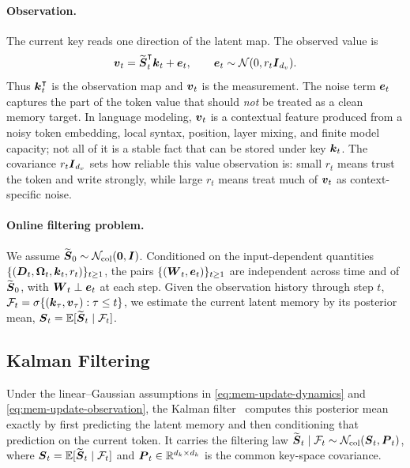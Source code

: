 \documentclass{article} %
\begin{document}
\paragraph{Observation.}
The current key reads one direction of the latent map. The observed value is
\begin{equation}
  \boldsymbol{v}_t = \widetilde{\boldsymbol{S}}_t^{\intercal}\boldsymbol{k}_t + \boldsymbol{e}_t,
  \qquad
  \boldsymbol{e}_t\sim\mathcal N(0,r_t \boldsymbol{I}_{d_v}).
  \label{eq:mem-update-observation}
\end{equation}
Thus $\boldsymbol{k}_t^{\intercal}$ is the observation map and $\boldsymbol{v}_t$ is the measurement. The noise term $\boldsymbol{e}_t$
captures the part of the token value that should \emph{not} be treated as a clean memory
target. In language modeling, $\boldsymbol{v}_t$ is a contextual feature produced from a noisy token embedding,
local syntax, position, layer mixing, and finite model capacity; not all of it is a stable
fact that can be stored under key $\boldsymbol{k}_t$. The covariance $r_t\boldsymbol{I}_{d_v}$ sets how reliable this value
observation is: small $r_t$ means trust the token and write strongly, while large $r_t$ means
treat much of $\boldsymbol{v}_t$ as context-specific noise.

\paragraph{Online filtering problem.}
We assume $\widetilde{\boldsymbol{S}}_0\sim\mathcal N_{\mathrm{col}}(\boldsymbol{0},\boldsymbol{I})$. Conditioned on the
input-dependent quantities $\{(\boldsymbol{D}_t,\boldsymbol{\Omega}_t,\boldsymbol{k}_t,r_t)\}_{t\geq1}$, the pairs
$\{(\boldsymbol{W}_t,\boldsymbol{e}_t)\}_{t\geq1}$ are independent across time and of
$\widetilde{\boldsymbol{S}}_0$, with $\boldsymbol{W}_t\perp\boldsymbol{e}_t$ at each step.
Given the observation history through step $t$,
$\mathcal{F}_t=\sigma\{(\boldsymbol{k}_\tau,\boldsymbol{v}_\tau):\tau\leq t\}$, we estimate the current latent
memory by its posterior mean, $\boldsymbol{S}_t=\mathbb{E}[\widetilde{\boldsymbol{S}}_t\mid\mathcal{F}_t]$.

\subsection{Kalman Filtering}
\label{sec:kalman-filtering}

Under the linear--Gaussian assumptions in \eqref{eq:mem-update-dynamics} and
\eqref{eq:mem-update-observation}, the Kalman filter~\citep{kalman1960new} computes this posterior mean exactly by first
predicting the latent memory and then conditioning that prediction on the current token. It carries
the filtering law
$\widetilde{\boldsymbol{S}}_t\mid\mathcal{F}_t
\sim\mathcal N_{\mathrm{col}}(\boldsymbol{S}_t,\boldsymbol{P}_t)$, where
$\boldsymbol{S}_t=\mathbb{E}[\widetilde{\boldsymbol{S}}_t\mid\mathcal{F}_t]$ and
$\boldsymbol{P}_t\in\mathbb{R}^{d_k\times d_k}$ is the common key-space covariance.
\end{document}
